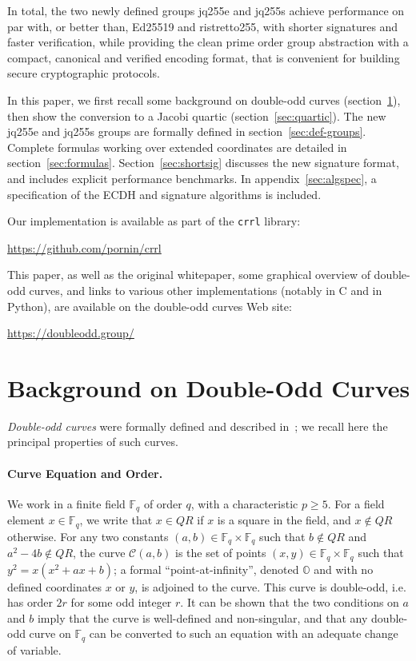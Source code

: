 \documentclass{llncs}
\newcommand{\QR}{QR}
\newcommand{\bF}{\mathbb{F}}
\newcommand{\cC}{\mathcal{C}}
\newcommand{\neutral}{\mathbb{O}}
\begin{document}
In total, the two newly defined groups jq255e and jq255s achieve
performance on par with, or better than, Ed25519 and ristretto255, with
shorter signatures and faster verification, while providing the clean
prime order group abstraction with a compact, canonical and verified
encoding format, that is convenient for building secure cryptographic
protocols.

In this paper, we first recall some background on double-odd curves
(section~\ref{sec:background}), then show the conversion to a Jacobi
quartic (section~\ref{sec:quartic}). The new jq255e and jq255s groups
are formally defined in section~\ref{sec:def-groups}. Complete formulas
working over extended coordinates are detailed in
section~\ref{sec:formulas}. Section~\ref{sec:shortsig} discusses the new
signature format, and includes explicit performance benchmarks. In
appendix~\ref{sec:algspec}, a specification of the ECDH and signature
algorithms is included.

Our implementation is available as part of the \verb+crrl+ library:
\begin{center}
    \url{https://github.com/pornin/crrl}
\end{center}
This paper, as well as the original whitepaper\cite{Por2020-5}, some
graphical overview of double-odd curves, and links to various other
implementations (notably in C and in Python), are available on the
double-odd curves Web site:
\begin{center}
    \url{https://doubleodd.group/}
\end{center}


\section{Background on Double-Odd Curves}\label{sec:background}

\emph{Double-odd curves} were formally defined and described
in~\cite{Por2020-5}; we recall here the principal properties of
such curves.

\paragraph{Curve Equation and Order.}
We work in a finite field $\bF_q$ of order $q$, with a characteristic
$p \geq 5$. For a field element $x \in \bF_q$, we write that $x\in\QR$
if $x$ is a square in the field, and $x\notin\QR$ otherwise. For any two
constants $(a, b) \in \bF_q\times\bF_q$ such that $b\notin\QR$ and
$a^2-4b\notin\QR$, the curve $\cC(a,b)$ is the set of points
$(x,y)\in\bF_q\times\bF_q$ such that $y^2 = x(x^2 + ax + b)$; a formal
``point-at-infinity'', denoted $\neutral$ and with no defined
coordinates $x$ or $y$, is adjoined to the curve. This curve is
double-odd, i.e. has order $2r$ for some odd integer $r$. It can be
shown that the two conditions on $a$ and $b$ imply that the curve is
well-defined and non-singular, and that any double-odd curve on $\bF_q$
can be converted to such an equation with an adequate change of
variable.
\end{document}
